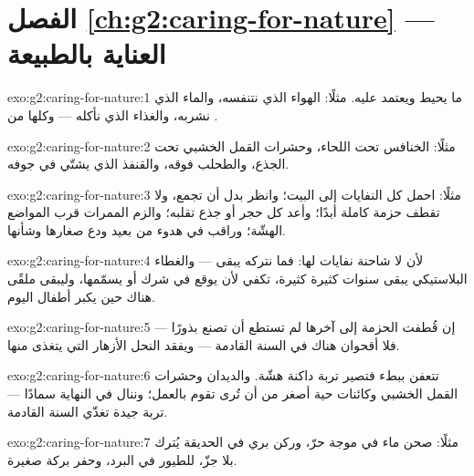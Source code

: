 \section*{الفصل \ref{ch:g2:caring-for-nature} --- العناية بالطبيعة}

\begin{solution}{exo:g2:caring-for-nature:1}
ما يحيط  ويعتمد عليه. مثلًا: الهواء الذي نتنفسه،
والماء الذي نشربه، والغذاء الذي نأكله --- وكلها من .
\end{solution}

\begin{solution}{exo:g2:caring-for-nature:2}
مثلًا: الخنافس تحت اللحاء، وحشرات القمل الخشبي تحت الجذع، والطحلب
فوقه، والقنفذ الذي يشتّي في جوفه.
\end{solution}

\begin{solution}{exo:g2:caring-for-nature:3}
مثلًا: احمل كل النفايات إلى البيت؛ وانظر بدل أن تجمع، ولا تقطف
حزمة كاملة أبدًا؛ وأعد كل حجر أو جذع تقلبه؛ والزم الممرات قرب
المواضع الهشّة؛ وراقب  في هدوء من بعيد ودع صغارها وشأنها.
\end{solution}

\begin{solution}{exo:g2:caring-for-nature:4}
لأن  لا شاحنة نفايات لها: فما نتركه يبقى --- والغطاء
البلاستيكي يبقى سنوات كثيرة كثيرة، تكفي لأن يوقع  في شرك
أو يسمّمها، وليبقى ملقًى هناك حين يكبر أطفال اليوم.
\end{solution}

\begin{solution}{exo:g2:caring-for-nature:5}
إن قُطفت الحزمة إلى آخرها لم تستطع أن تصنع بذورًا --- فلا أقحوان
هناك في السنة القادمة --- ويفقد النحل الأزهار التي يتغذى منها.
\end{solution}

\begin{solution}{exo:g2:caring-for-nature:6}
تتعفن ببطء فتصير تربة داكنة هشّة. والديدان وحشرات القمل الخشبي
وكائنات حية أصغر من أن تُرى تقوم بالعمل؛ وننال في النهاية سمادًا
--- تربة جيدة تغذّي  السنة القادمة.
\end{solution}

\begin{solution}{exo:g2:caring-for-nature:7}
مثلًا: صحن ماء في موجة حرّ، وركن بري في الحديقة يُترك بلا جزّ،
 للطيور في البرد، وحفر بركة صغيرة.
\end{solution}

